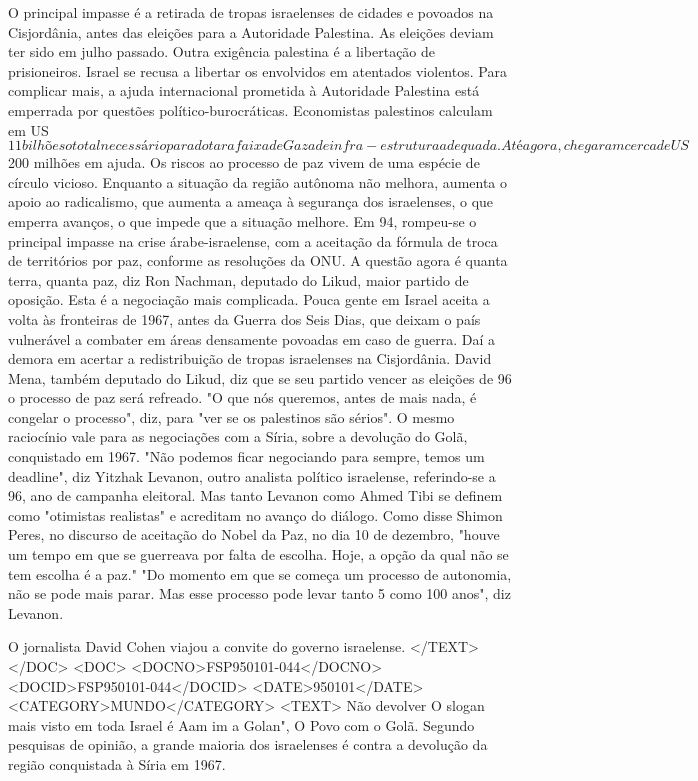 O principal impasse é a retirada de tropas israelenses de cidades e povoados na Cisjordânia, antes das eleições para a Autoridade Palestina. As eleições deviam ter sido em julho passado.
Outra exigência palestina é a libertação de prisioneiros. Israel se recusa a libertar os envolvidos em atentados violentos.
Para complicar mais, a ajuda internacional prometida à Autoridade Palestina está emperrada por questões político-burocráticas.
Economistas palestinos calculam em US$ 11 bilhões o total necessário para dotar a faixa de Gaza de infra-estrutura adequada. Até agora, chegaram cerca de US$ 200 milhões em ajuda.
Os riscos ao processo de paz vivem de uma espécie de círculo vicioso. Enquanto a situação da região autônoma não melhora, aumenta o apoio ao radicalismo, que aumenta a ameaça à segurança dos israelenses, o que emperra avanços, o que impede que a situação melhore.
Em 94, rompeu-se o principal impasse na crise árabe-israelense, com a aceitação da fórmula de troca de territórios por paz, conforme as resoluções da ONU.  A questão agora é quanta terra, quanta paz, diz Ron Nachman, deputado do Likud, maior partido de oposição.
Esta é a negociação mais complicada. Pouca gente em Israel aceita a volta às fronteiras de 1967, antes da Guerra dos Seis Dias, que deixam o país vulnerável a combater em áreas densamente povoadas em caso de guerra. Daí a demora em acertar a redistribuição de tropas israelenses na Cisjordânia.
David Mena, também deputado do Likud, diz que se seu partido vencer as eleições de 96 o processo de paz será refreado. "O que nós queremos, antes de mais nada, é congelar o processo", diz, para "ver se os palestinos são sérios".
O mesmo raciocínio vale para as negociações com a Síria, sobre a devolução do Golã, conquistado em 1967. "Não podemos ficar negociando para sempre, temos um deadline", diz Yitzhak Levanon, outro analista político israelense, referindo-se a 96, ano de campanha eleitoral.
Mas tanto Levanon como Ahmed Tibi se definem como "otimistas realistas" e acreditam no avanço do diálogo.
Como disse Shimon Peres, no discurso de aceitação do Nobel da Paz, no dia 10 de dezembro, "houve um tempo em que se guerreava por falta de escolha. Hoje, a opção da qual não se tem escolha é a paz."
"Do momento em que se começa um processo de autonomia, não se pode mais parar. Mas esse processo pode levar tanto 5 como 100 anos", diz Levanon.

O jornalista David Cohen viajou a convite do governo israelense.
</TEXT>
</DOC>
<DOC>
<DOCNO>FSP950101-044</DOCNO>
<DOCID>FSP950101-044</DOCID>
<DATE>950101</DATE>
<CATEGORY>MUNDO</CATEGORY>
<TEXT>
Não devolver 
O slogan mais visto em toda Israel é  Aam im a Golan", O Povo com o Golã. Segundo pesquisas de opinião, a grande maioria dos israelenses é contra a devolução da região conquistada à Síria em 1967.

